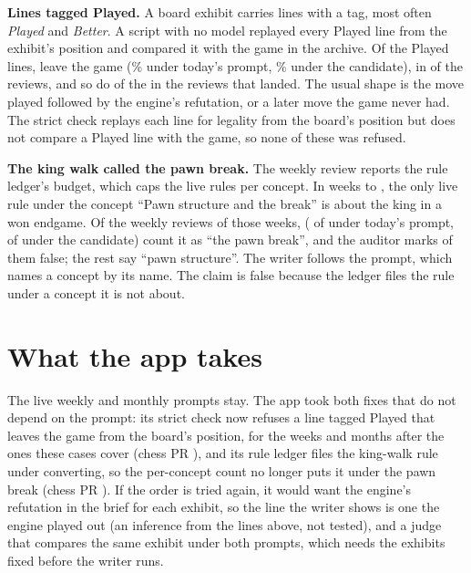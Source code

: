 \documentclass[11pt]{article}
\begin{document}
\textbf{Lines tagged Played.} A board exhibit carries lines with a tag, most often \emph{Played} and
\emph{Better}. A script with no model replayed every Played line from the exhibit's position and
compared it with the game in the archive. Of the \PlayedAll{} Played lines, \PlayedWrongAll{} leave
the game (\BasePlayedShare\% under today's prompt, \CandPlayedShare\% under the candidate), in
\PlayedReviewsAll{} of the \WriterRuns{} reviews, and so do \LandedPlayedWrong{} of the
\LandedPlayed{} in the reviews that landed. The usual shape is the move played followed by the
engine's refutation, or a later move the game never had. The strict check replays each line for
legality from the board's position but does not compare a Played line with the game, so none of
these was refused.

\textbf{The king walk called the pawn break.} The weekly review reports the rule ledger's budget,
which caps the live rules per concept. In weeks \WalkFirst{} to \WalkLast, the only live rule under
the concept ``Pawn structure and the break'' is about the king in a won endgame. Of the \WalkOf{}
weekly reviews of those weeks, \WalkReviews{} (\WalkBase{} of \WalkBaseOf{} under
today's prompt, \WalkCand{} of \WalkCandOf{} under the candidate) count it as ``the pawn break'', and
the auditor marks \WalkFlagged{} of them false; the rest say ``pawn structure''. The writer follows
the prompt, which names a concept by its name. The claim is false because the ledger files the rule
under a concept it is not about.

\section{What the app takes}

The live weekly and monthly prompts stay. The app took both fixes that do not depend on the
prompt: its strict check now refuses a line tagged Played that leaves the game from the board's
position, for the weeks and months after the ones these cases cover (chess PR \PlayedCheckPR), and
its rule ledger files the king-walk rule under converting, so the per-concept count no longer puts
it under the pawn break (chess PR \WalkRefilePR). If the order is tried again, it would want the
engine's refutation in the brief for each exhibit, so the line the writer shows is one the engine
played out (an inference from the lines above, not tested), and a judge that compares the same
exhibit under both prompts, which needs the exhibits fixed before the writer runs.
\end{document}
